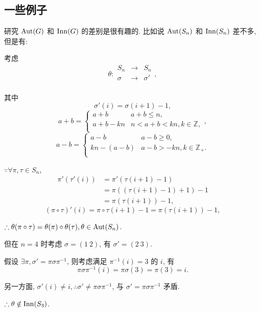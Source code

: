 \documentclass[color=black,device=normal,lang=cn,mode=geye]{elegantnote}
\begin{document}
\subsection{一些例子}
研究 $\operatorname{Aut}(G)$ 和 $\operatorname{Inn}(G)$ 的差别是很有趣的. 比如说 $\operatorname{Aut}(S_n)$ 和 $\operatorname{Inn}(S_n)$ 差不多, 但是有:
\begin{example}
    考虑
    \[\theta:\begin{array}{rcl}
        S_n & \to & S_n \\
        \sigma & \to & \sigma' \\
    \end{array},\]

    其中
    \[\sigma'(i)=\sigma(i+1)-1,\]
    \[a+b=\begin{cases}
        a+b & a+b\leq n, \\
        a+b-kn & n<a+b<kn,k\in\mathbb{Z}, \\
    \end{cases},\]
    \[a-b=\begin{cases}
        a-b & a-b\geq 0, \\
        kn-(a-b) & a-b>-kn,k\in\mathbb{Z}_+. \\
    \end{cases}\]
    
    $\because\forall\pi,\tau\in S_n$,
    \begin{align*}
        \pi'(\tau'(i)) & =\pi'(\tau(i+1)-1) \\
        & =\pi((\tau(i+1)-1)+1)-1 \\
        & =\pi(\tau(i+1))-1,
    \end{align*}
    \[(\pi\circ\tau)'(i)=\pi\circ\tau(i+1)-1=\pi(\tau(i+1))-1,\]

    $\therefore\theta(\pi\circ\tau)=\theta(\pi)\circ\theta(\tau),\theta\in\operatorname{Aut}(S_n)$.

    但在 $n=4$ 时考虑 $\sigma=(1\ 2)$, 有 $\sigma'=(2\ 3)$.

    假设 $\exists\pi,\sigma'=\pi\sigma\pi^{-1}$, 则考虑满足 $\pi^{-1}(i)=3$ 的 $i$, 有
    \[\pi\sigma\pi^{-1}(i)=\pi\sigma(3)=\pi(3)=i.\]

    另一方面, $\sigma'(i)\neq i,\therefore\sigma'\neq\pi\sigma\pi^{-1}$, 与 $\sigma'=\pi\sigma\pi^{-1}$ 矛盾.

    $\therefore\theta\notin\operatorname{Inn}(S_3)$.
\end{example}
\end{document}
